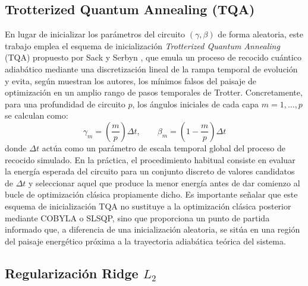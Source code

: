 \subsection{Trotterized Quantum Annealing (TQA)}
\label{subsec:tqa}

En lugar de inicializar los parámetros del circuito $(\gamma, \beta)$ de forma aleatoria, este trabajo emplea el esquema de inicialización \textit{Trotterized Quantum Annealing} (TQA) propuesto por Sack y Serbyn \cite{SackSerbyn2021}, que emula un proceso de recocido cuántico adiabático mediante una discretización lineal de la rampa temporal de evolución y evita, según muestran los autores, los mínimos falsos del paisaje de optimización en un amplio rango de pasos temporales de Trotter. Concretamente, para una profundidad de circuito $p$, los ángulos iniciales de cada capa $m = 1, \dots, p$ se calculan como:
\begin{equation}
    \gamma_m = \left(\frac{m}{p}\right) \Delta t, \qquad
    \beta_m = \left(1 - \frac{m}{p}\right) \Delta t
    \label{eq:tqa_schedule}
\end{equation}
donde $\Delta t$ actúa como un parámetro de escala temporal global del proceso de recocido simulado. En la práctica, el procedimiento habitual consiste en evaluar la energía esperada del circuito para un conjunto discreto de valores candidatos de $\Delta t$ y seleccionar aquel que produce la menor energía antes de dar comienzo al bucle de optimización clásica propiamente dicho. Es importante señalar que este esquema de inicialización TQA no sustituye a la optimización clásica posterior mediante COBYLA o SLSQP, sino que proporciona un punto de partida informado que, a diferencia de una inicialización aleatoria, se sitúa en una región del paisaje energético próxima a la trayectoria adiabática teórica del sistema.

\subsection{Regularización Ridge $L_2$}
\label{subsec:ridge_l2}

